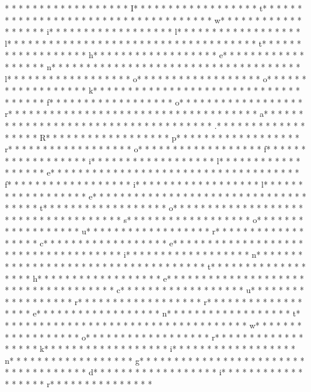* * *  * * *  * * *  *  * * *  *  * * *  * I* * *  * * *  * * *  *  * * *  *  * * *  * t* * *  * * *  * * *  *  * * *  *  * * *  *  * * *  * * *  * * *  *  * * *  *  * * *  * w* * *  * * *  * * *  *  * * *  *  * * *  * i* * *  * * *  * * *  *  * * *  *  * * *  * l* * *  * * *  * * *  *  * * *  *  * * *  * l* * *  * * *  * * *  *  * * *  *  * * *  *  * * *  * * *  * * *  *  * * *  *  * * *  * t* * *  * * *  * * *  *  * * *  *  * * *  * h* * *  * * *  * * *  *  * * *  *  * * *  * e* * *  * * *  * * *  *  * * *  *  * * *  * n* * *  * * *  * * *  *  * * *  *  * * *  *  * * *  * * *  * * *  *  * * *  *  * * *  * l* * *  * * *  * * *  *  * * *  *  * * *  * o* * *  * * *  * * *  *  * * *  *  * * *  * o* * *  * * *  * * *  *  * * *  *  * * *  * k* * *  * * *  * * *  *  * * *  *  * * *  *  * * *  * * *  * * *  *  * * *  *  * * *  * f* * *  * * *  * * *  *  * * *  *  * * *  * o* * *  * * *  * * *  *  * * *  *  * * *  * r* * *  * * *  * * *  *  * * *  *  * * *  *  * * *  * * *  * * *  *  * * *  *  * * *  * a* * *  * * *  * * *  *  * * *  *  * * *  *  * * *  * * *  * * *  *  * * *  *  * * *  * .* * *  * * *  * * *  *  * * *  *  * * *  * R* * *  * * *  * * *  *  * * *  *  * * *  * p* * *  * * *  * * *  *  * * *  *  * * *  * r* * *  * * *  * * *  *  * * *  *  * * *  * o* * *  * * *  * * *  *  * * *  *  * * *  * f* * *  * * *  * * *  *  * * *  *  * * *  * i* * *  * * *  * * *  *  * * *  *  * * *  * l* * *  * * *  * * *  *  * * *  *  * * *  * e* * *  * * *  * * *  *  * * *  *  * * *  *  * * *  * * *  * * *  *  * * *  *  * * *  * f* * *  * * *  * * *  *  * * *  *  * * *  * i* * *  * * *  * * *  *  * * *  *  * * *  * l* * *  * * *  * * *  *  * * *  *  * * *  * e* * *  * * *  * * *  *  * * *  *  * * *  *  * * *  * * *  * * *  *  * * *  *  * * *  * t* * *  * * *  * * *  *  * * *  *  * * *  * o* * *  * * *  * * *  *  * * *  *  * * *  *  * * *  * * *  * * *  *  * * *  *  * * *  * s* * *  * * *  * * *  *  * * *  *  * * *  * o* * *  * * *  * * *  *  * * *  *  * * *  * u* * *  * * *  * * *  *  * * *  *  * * *  * r* * *  * * *  * * *  *  * * *  *  * * *  * c* * *  * * *  * * *  *  * * *  *  * * *  * e* * *  * * *  * * *  *  * * *  *  * * *  *  * * *  * * *  * * *  *  * * *  *  * * *  * i* * *  * * *  * * *  *  * * *  *  * * *  * n* * *  * * *  * * *  *  * * *  *  * * *  *  * * *  * * *  * * *  *  * * *  *  * * *  * t* * *  * * *  * * *  *  * * *  *  * * *  * h* * *  * * *  * * *  *  * * *  *  * * *  * e* * *  * * *  * * *  *  * * *  *  * * *  *  * * *  * * *  * * *  *  * * *  *  * * *  * c* * *  * * *  * * *  *  * * *  *  * * *  * u* * *  * * *  * * *  *  * * *  *  * * *  * r* * *  * * *  * * *  *  * * *  *  * * *  * r* * *  * * *  * * *  *  * * *  *  * * *  * e* * *  * * *  * * *  *  * * *  *  * * *  * n* * *  * * *  * * *  *  * * *  *  * * *  * t* * *  * * *  * * *  *  * * *  *  * * *  *  * * *  * * *  * * *  *  * * *  *  * * *  * w* * *  * * *  * * *  *  * * *  *  * * *  * o* * *  * * *  * * *  *  * * *  *  * * *  * r* * *  * * *  * * *  *  * * *  *  * * *  * k* * *  * * *  * * *  *  * * *  *  * * *  * i* * *  * * *  * * *  *  * * *  *  * * *  * n* * *  * * *  * * *  *  * * *  *  * * *  * g* * *  * * *  * * *  *  * * *  *  * * *  *  * * *  * * *  * * *  *  * * *  *  * * *  * d* * *  * * *  * * *  *  * * *  *  * * *  * i* * *  * * *  * * *  *  * * *  *  * * *  * r* * *  * * *  * * *  *  * * *  *  * 